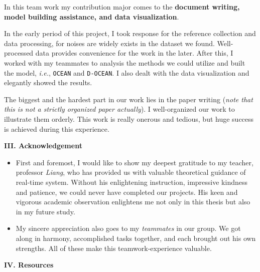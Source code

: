 \documentclass[a4paper]{article}
\begin{document}
\large{
In this team work my contribution major comes to the \textbf{document writing, model building assistance, and data visualization}. 

In the early period of this project, I took response for the reference collection and data processing, for noises are widely exists in the dataset we found. Well-processed data provides convenience for the work in the later. After this, I worked with my teammates to analysis the methods we could utilize and built the model, \textit{i.e.}, \texttt{OCEAN} and \texttt{D-OCEAN}. I also dealt with the data visualization and elegantly showed the results. 

The biggest and the hardest part in our work lies in the paper writing (\textit{note that this is not a strictly organized paper actually}). I well-organized our work to illustrate them orderly. This work is really onerous and tedious, but huge success is achieved during this experience.}


\vspace{5mm}
\begin{center}
\LARGE\textbf{III. Acknowledgement} \\
\end{center}
\vspace{.5mm}

\begin{itemize} \item{First and foremost, I would like to show my deepest gratitude to my teacher, professor \textit{Liang}, who has provided us with valuable theoretical guidance of real-time system. Without his enlightening instruction, impressive kindness and patience, we could never have completed our projects. His keen and vigorous academic observation enlightens me not only in this thesis but also in my future study.}
\item{My sincere appreciation also goes to my \textit{teammates} in our group. We got along in harmony, accomplished tasks together, and each brought out his own strengths. All of these make this teamwork-experience valuable.}
\end{itemize}

\vspace{5mm}
\begin{center}
\LARGE\textbf{IV. Resources} \\
\end{center}
\vspace{1mm}
\begin{center}
    
\end{center}
\end{document}
